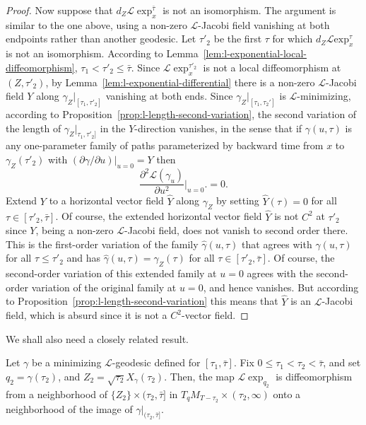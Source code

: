 \begin{proof}
 Now suppose  that $d_Z{\mathcal L}\exp_x^{\bar\tau}$ is not an isomorphism.
The argument is similar to the one above, using a non-zero
${\mathcal L}$-Jacobi field vanishing at both endpoints rather than
another geodesic. Let $\tau'_2$ be the first $\tau$ for which
$d_Z{\mathcal L}\mathrm{exp}_x^\tau$ is not an isomorphism.
According to Lemma~\ref{lem:l-exponential-local-diffeomorphism}, $\tau_1<\tau'_2\le \bar\tau$. Since
${\mathcal L}\exp_x^{\tau'_2}$ is not a local diffeomorphism at
$(Z,\tau'_2)$, by Lemma~\ref{lem:l-exponential-differential}  there is a non-zero
${\mathcal L}$-Jacobi field $Y$ along $\gamma_Z|_{[\tau_1,\tau'_2]}$
vanishing at both ends. Since $\gamma_Z|_{[\tau_1,\tau_2']}$ is
${\mathcal L}$-minimizing, according to Proposition~\ref{prop:l-length-second-variation},
the second variation of the length of $\gamma_Z|_{\tau_1,\tau'_2]}$
in the $Y$-direction vanishes, in the sense that if $\gamma(u,\tau)$
is any one-parameter family of paths parameterized by backward time
from $x$ to $\gamma_Z(\tau'_2)$ with $(\partial \gamma/\partial
u)|_{u=0}=Y$ then
$$\frac{\partial^2{\mathcal L}(\gamma_u)}{\partial
u^2}\bigl|_{u=0}\bigr.=0.$$ Extend $Y$ to a horizontal vector field
$\widehat Y$ along $\gamma_Z$ by setting $\widehat Y(\tau)=0$ for
all $\tau\in [\tau'_2,\bar\tau]$. Of course, the extended horizontal
vector field $\widehat Y$ is not $C^2$ at $\tau'_2$ since $Y$, being
a non-zero ${\mathcal L}$-Jacobi field, does not vanish to second
order there. This is the first-order variation of the family
$\hat\gamma(u,\tau)$ that agrees with $\gamma(u,\tau)$ for all
$\tau\le \tau'_2$ and has $\hat\gamma(u,\tau)=\gamma_Z(\tau)$ for
all $\tau\in [\tau'_2,\bar\tau]$. Of course, the second-order
variation of this extended family at $u=0$ agrees with the
second-order variation of the original family at $u=0$, and hence
vanishes. But according to Proposition~\ref{prop:l-length-second-variation} this means that
$\widehat Y$ is an ${\mathcal L}$-Jacobi field, which is absurd
since it is not a $C^2$-vector field.
\end{proof}



We shall also need a closely related result.

\begin{proposition}\label{prop:l-exponential-diffeomorphism-along-geodesic}
\label{tausmooth}

Let $\gamma$ be a minimizing ${\mathcal L}$-geodesic defined for
$[\tau_1,\bar\tau]$. Fix $0\le\tau_1<\tau_2<\bar\tau$, and set
$q_2=\gamma(\tau_2)$, and $Z_2=\sqrt{\tau_2}X_{\gamma}(\tau_2)$.
Then, the map ${\mathcal L}\exp_{q_2}$ is  diffeomorphism from
a neighborhood of $\{Z_2\}\times (\tau_2,\bar\tau]$ in
$T_{q}M_{T-\tau_2}\times (\tau_2,\infty)$ onto a neighborhood of the
image of  $\gamma|_{(\tau_2,\bar\tau]}$.
\end{proposition}

